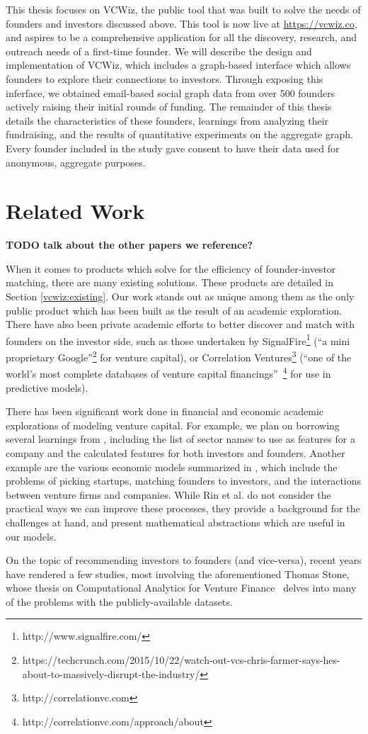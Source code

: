 This thesis focuses on VCWiz, the public tool that was built to solve the needs of founders and investors discussed above. This tool is now live at \url{https://vcwiz.co}, and aspires to be a comprehensive application for all the discovery, research, and outreach needs of a first-time founder. We will describe the design and implementation of VCWiz, which includes a graph-based interface which allows founders to explore their connections to investors. Through exposing this inferface, we obtained email-based social graph data from over 500 founders actively raising their initial rounds of funding. The remainder of this thesis details the characteristics of these founders, learnings from analyzing their fundraising, and the results of quantitative experiments on the aggregate graph. Every founder included in the study gave consent to have their data used for anonymous, aggregate purposes.

\section{Related Work}

\textbf{TODO talk about the other papers we reference?}

When it comes to products which solve for the efficiency of founder-investor matching, there are many existing solutions. These products are detailed in Section \ref{vcwiz:existing}. Our work stands out as unique among them as the only public product which has been built as the result of an academic exploration. There have also been private academic efforts to better discover and match with founders on the investor side, such as those undertaken by SignalFire\footnote{http://www.signalfire.com/} (``a  mini proprietary Google''\footnote{https://techcrunch.com/2015/10/22/watch-out-vcs-chris-farmer-says-hes-about-to-massively-disrupt-the-industry/} for venture capital), or Correlation Ventures\footnote{http://correlationvc.com} (``one of the world’s most complete databases of venture capital financings''~\footnote{http://correlationvc.com/approach/about} for use in predictive models).

There has been significant work done in financial and economic academic explorations of modeling venture capital. For example, we plan on borrowing several learnings from \cite{2017arXiv170604229H}, including the list of sector names to use as features for a company and the calculated features for both investors and founders. Another example are the various economic models summarized in \cite{venture-survey}, which include the problems of picking startups, matching founders to investors, and the interactions between venture firms and companies. While Rin et al. do not consider the practical ways we can improve these processes, they provide a background for the challenges at hand, and present mathematical abstractions which are useful in our models.

On the topic of recommending investors to founders (and vice-versa), recent years have rendered a few studies, most involving the aforementioned Thomas Stone, whose thesis on Computational Analytics for Venture Finance~\cite{stone2014computational} delves into many of the problems with the publicly-available datasets.
